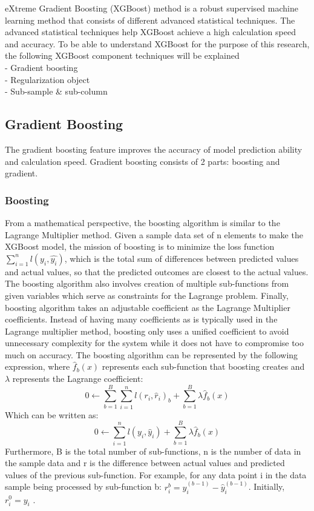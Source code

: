 eXtreme Gradient Boosting (XGBoost) method is a robust supervised machine 
learning method that consists of different advanced statistical techniques. 
The advanced statistical techniques help XGBoost achieve a high calculation 
speed and accuracy. To be able to understand XGBoost for the purpose of this 
research, the following XGBoost component techniques will be explained\\
- Gradient boosting\\
- Regularization object\\
- Sub-sample \& sub-column
\subsection{Gradient Boosting}
The gradient boosting feature improves the accuracy of model prediction 
ability and calculation speed. Gradient boosting consists of 2 parts: 
boosting and gradient.
\subsubsection*{Boosting}
From a mathematical perspective, the boosting algorithm is similar to the 
Lagrange Multiplier method. Given a sample data set of n elements to make 
the XGBoost model, the mission of boosting is to minimize the loss function
$\sum_{i=1}^{n} l\left(y_{i}, \hat{y_{i}}\right)$, 
which is the total sum of differences between predicted values and actual 
values, so that the predicted outcomes are closest to the actual values. 
The boosting algorithm also involves creation of multiple sub-functions from 
given variables which serve as constraints for the Lagrange problem. Finally, 
boosting algorithm takes an adjustable coefficient as the Lagrange Multiplier 
coefficients. Instead of having many coefficients as is typically used in the 
Lagrange multiplier method, boosting only uses a unified coefficient to avoid 
unnecessary complexity for the system while it does not have to compromise too 
much on accuracy. The boosting algorithm can be represented by the following 
expression, where $\hat{f}_b(x)$ represents each sub-function that boosting creates and 
$\lambda$ represents the Lagrange coefficient:
\begin{equation}
    0 \leftarrow \sum_{b=1}^{B} \sum_{i=1}^{n} l\left(r_{i}, \hat{r}_{i}\right)_{b}+\sum_{b=1}^{B} \lambda \hat{f}_{b}(x)
\end{equation}
Which can be written as:
\begin{equation}
    0\leftarrow \sum_{i=1}^{n} l\left(y_{i}, \hat{y}_{i}\right)+\sum_{b=1}^{B} \lambda \hat{f}_{b}(x)
\end{equation}
Furthermore, B is the total number of sub-functions, n is the number of data 
in the sample data and r is the difference between actual values and predicted 
values of the previous sub-function. For example, for any data point i in the 
data sample being processed by sub-function b:
$r_{i}^{b}=y_i^{(b-1)}-\hat{y}_i^{(b-1)}$. 
Initially, $r_{i}^{0}=y_i$ \cite{james_introduction_2013}.
